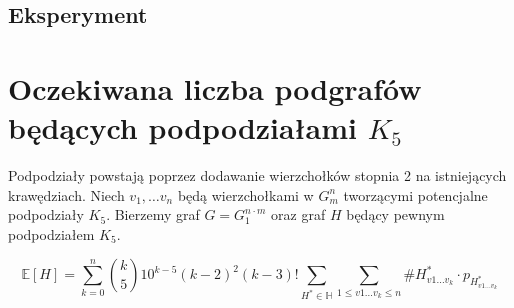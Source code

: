 \documentclass{article}
\begin{document}
\newpage

\subsection{Eksperyment}

\newpage

\section{Oczekiwana liczba podgrafów będących podpodziałami $K_5$}
Podpodziały powstają poprzez dodawanie wierzchołków stopnia 2 na istniejących krawędziach.
\newline
Niech $v_1, \ldots v_n$ będą wierzchołkami w $G_m^n$ tworzącymi potencjalne podpodziały $K_5$.
Bierzemy graf $G = G_1^{n \cdot m}$ oraz graf  $H$ będący pewnym podpodziałem $K_5$.

\begin{dmath}
  \mathbb{E}[H] = \sum_{k=0}^n \binom{k}{5}10^{k-5}(k-2)^2(k-3)! \sum_{H^* \in \mathbb{H}} \sum_{1 \leq v1 \ldots v_k \leq n} \#H_{v1 \ldots v_k}^* \cdot p_{H_{v1 \ldots v_k}^*}
\end{dmath}
\end{document}
